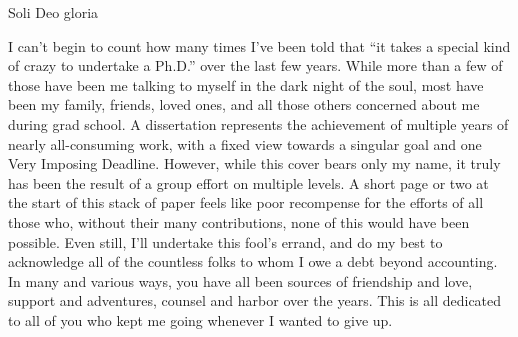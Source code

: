 \documentclass[
]{ucbthesis}
\begin{document}
\begin{frontmatter}

\begin{dedication}
\null\vfil
\begin{center}

Soli Deo gloria
\end{center}
\vfil\null
\end{dedication}


\tableofcontents
\clearpage
\listoffigures
\clearpage
\listoftables

\begin{acknowledgements}

I can't begin to count how many times I've been told that \enquote{it takes a special kind of crazy to undertake a Ph.D.}  over the last few years.
While more than a few of those have been me talking to myself in the dark night of the soul, most have been my family, friends, loved ones, and all those others concerned about me during grad school.
A dissertation represents the achievement of multiple years of  nearly all-consuming work, with a fixed view towards a singular goal and one Very Imposing Deadline. 
However, while this cover bears only my name, it truly has been the result of a group effort on multiple levels.
A short page or two at the start of this stack of paper feels like poor recompense for the efforts of all those who, without their many contributions, none of this would have been possible.
Even still, I'll undertake this fool's errand, and do my best to acknowledge all of the countless folks to whom I owe a debt beyond accounting.
In many and various ways, you have all been sources of friendship and love, support and adventures, counsel and harbor over the years.
This is all dedicated to all of you  who kept me going whenever I wanted to give up.




\end{acknowledgements}
\end{frontmatter}
\end{document}

